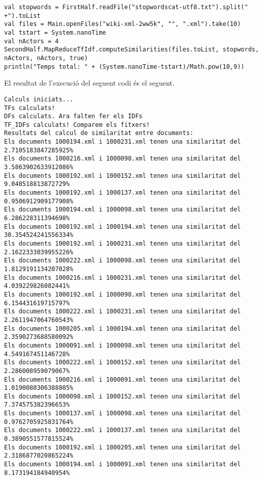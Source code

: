 \documentclass{report}
\begin{document}
\begin{lstlisting}[style=scalaHighlight]
val stopwords = FirstHalf.readFile("stopwordscat-utf8.txt").split(" +").toList
val files = Main.openFiles("wiki-xml-2ww5k", "", ".xml").take(10)
val tstart = System.nanoTime
val nActors = 4
SecondHalf.MapReduceTfIdf.computeSimilarities(files.toList, stopwords, nActors, nActors, true)
println("Temps total: " + (System.nanoTime-tstart)/Math.pow(10,9))
\end{lstlisting}

\newpage 

El resultat de l'execució del seguent codi és el seguent.

\begin{verbatim}
Calculs iniciats...
TFs calculats!
DFs calculats. Ara falten fer els IDFs
TF_IDFs calculats! Comparem els fitxers!
Resultats del calcul de similaritat entre documents:
Els documents 1000194.xml i 1000231.xml tenen una similaritat del 2.7105183847285925%
Els documents 1000216.xml i 1000098.xml tenen una similaritat del 3.5863902633912086%
Els documents 1000192.xml i 1000152.xml tenen una similaritat del 9.048518813872729%
Els documents 1000192.xml i 1000137.xml tenen una similaritat del 0.9506912909177908%
Els documents 1000194.xml i 1000098.xml tenen una similaritat del 6.286228311394698%
Els documents 1000192.xml i 1000194.xml tenen una similaritat del 30.354524241556334%
Els documents 1000192.xml i 1000231.xml tenen una similaritat del 2.1622333039955226%
Els documents 1000222.xml i 1000098.xml tenen una similaritat del 1.8129191134207028%
Els documents 1000216.xml i 1000231.xml tenen una similaritat del 4.039229826082441%
Els documents 1000192.xml i 1000098.xml tenen una similaritat del 6.154431619715797%
Els documents 1000222.xml i 1000231.xml tenen una similaritat del 2.2611947064760543%
Els documents 1000205.xml i 1000194.xml tenen una similaritat del 2.3590273688580092%
Els documents 1000091.xml i 1000098.xml tenen una similaritat del 4.549167451146728%
Els documents 1000222.xml i 1000152.xml tenen una similaritat del 2.286008959079067%
Els documents 1000216.xml i 1000091.xml tenen una similaritat del 1.0190080306388805%
Els documents 1000098.xml i 1000152.xml tenen una similaritat del 7.374575382396653%
Els documents 1000137.xml i 1000098.xml tenen una similaritat del 0.9762705925831764%
Els documents 1000222.xml i 1000137.xml tenen una similaritat del 0.3890551577815524%
Els documents 1000192.xml i 1000205.xml tenen una similaritat del 2.3186877020865224%
Els documents 1000194.xml i 1000091.xml tenen una similaritat del 8.173194184940954%

\end{verbatim}
\end{document}
